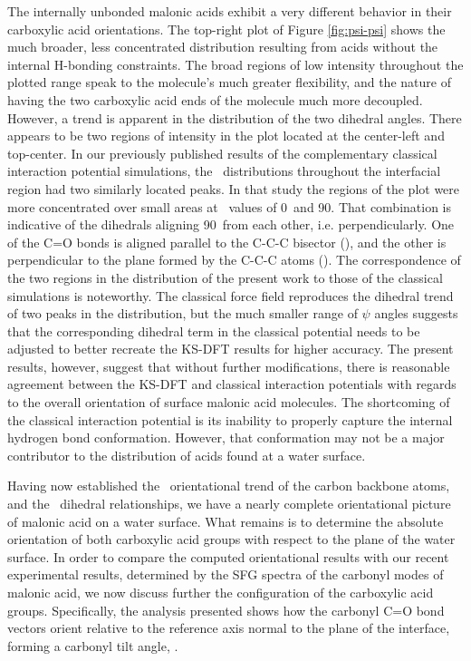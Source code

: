 The internally unbonded malonic acids exhibit a very different behavior in their carboxylic acid orientations. The top-right plot of Figure \ref{fig:psi-psi} shows the much broader, less concentrated distribution resulting from acids without the internal H-bonding constraints. The broad regions of low intensity throughout the plotted range speak to the molecule's much greater flexibility, and the nature of having the two carboxylic acid ends of the molecule much more decoupled. However, a trend is apparent in the distribution of the two dihedral angles. There appears to be two regions of intensity in the plot located at the center-left and top-center. In our previously published results of the complementary classical interaction potential simulations,\cite{Blower2012} the \psipsi~distributions throughout the interfacial region had two similarly located peaks. In that study the regions of the plot were more concentrated over small areas at \psipsi~values of 0\degr~and 90\degr. That combination is indicative of the dihedrals aligning 90\degr~from each other, i.e. perpendicularly. One of the C=O bonds is aligned parallel to the C-C-C bisector (\degr), and the other is perpendicular to the plane formed by the C-C-C atoms (\degr). The correspondence of the two regions in the distribution of the present work to those of the classical simulations is noteworthy. The classical force field reproduces the dihedral trend of two peaks in the distribution, but the much smaller range of $\psi$ angles suggests that the corresponding dihedral term in the classical potential needs to be adjusted to better recreate the KS-DFT results for higher accuracy. The present results, however, suggest that without further modifications, there is reasonable agreement between the KS-DFT and classical interaction potentials with regards to the overall orientation of surface malonic acid molecules. The shortcoming of the classical interaction potential is its inability to properly capture the internal hydrogen bond conformation. However, that conformation may not be a major contributor to the distribution of acids found at a water surface.

Having now established the \thetaphi~orientational trend of the carbon backbone atoms, and the \psipsi~dihedral relationships, we have a nearly complete orientational picture of malonic acid on a water surface. What remains is to determine the absolute orientation of both carboxylic acid groups with respect to the plane of the water surface. In order to compare the computed orientational results with our recent experimental results,\cite{Blower2012} determined by the SFG spectra of the carbonyl modes of malonic acid, we now discuss further the configuration of the carboxylic acid groups. Specifically, the analysis presented shows how the carbonyl C=O bond vectors orient relative to the reference axis normal to the plane of the interface, forming a carbonyl tilt angle, \thetacarb.

